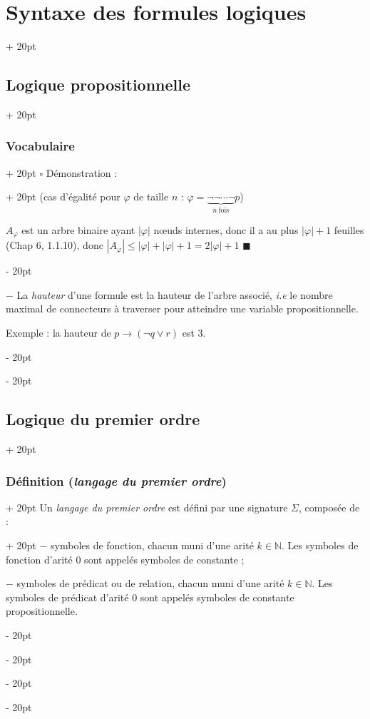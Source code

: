 \documentclass[a4paper, 12pt, twoside]{article}
\newcommand{\N}{\mathbb{N}} %
\newcommand{\abs}[1]{\left\lvert #1 \right\rvert}
\renewcommand{\le}{\leqslant}
\newcommand{\ind}[1][20pt]{\advance\leftskip + #1}
\newcommand{\deind}[1][20pt]{\advance\leftskip - #1}
\newenvironment{indt}[2][20pt]{#2 \par \ind[#1]}{\par \deind} %
\begin{document}
\begin{indt}{\section{Syntaxe des formules logiques}}
\begin{indt}{\subsection{Logique propositionnelle}}
\begin{indt}{\subsubsection{Vocabulaire}}
\begin{indt}{$\square$ Démonstration :}
                    (cas d'égalité pour $\varphi$ de taille $n$ : $\varphi = \underbrace{\neg \neg \cdots \neg}_{n\ \text{fois}} p$)
                    
                    $A_\varphi$ est un arbre binaire ayant $\abs{\varphi}$ n\oe uds internes, donc il a au plus $\abs \varphi + 1$ feuilles (Chap 6, 1.1.10), donc $\abs{A_\varphi} \le \abs \varphi + \abs \varphi + 1 = 2 \abs \varphi + 1$ $\blacksquare$
                \end{indt}
                
                \vspace{12pt}
                
                $-$ La \textit{hauteur} d'une formule est la hauteur de l'arbre associé, \textit{i.e} le nombre maximal de connecteurs à traverser pour atteindre une variable propositionnelle.
                
                Exemple : la hauteur de $p \rightarrow (\neg q \vee r)$ est 3.
            \end{indt}
        \end{indt}
        
        \vspace{12pt}
        
        \begin{indt}{\subsection{Logique du premier ordre}}
            \begin{indt}{\subsubsection{Définition (\textit{langage du premier ordre})}}
                \begin{indt}{Un \textit{langage du premier ordre} est défini par une signature $\Sigma$, composée de :}
                    $-$ symboles de fonction, chacun muni d'une arité $k \in \N$. Les symboles de fonction d'arité 0 sont appelés symboles de constante ;
                    
                    $-$ symboles de prédicat ou de relation, chacun muni d'une arité $k \in \N$. Les symboles de prédicat d'arité 0 sont appelés symboles de constante propositionnelle.
                \end{indt}
            \end{indt}
            

\end{indt}
\end{indt}
\end{document}
